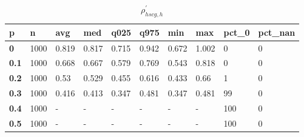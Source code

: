 \begin{table}[h]
 \centering 
\footnotesize
\caption{$\rho_{hscg,h}^\prime $}
\label{tab:alphahscgh}
\begin{tabular}[h]{|l|l|l|l|l|l|l|l|l|l|
    } \hline
\textbf{ p} & \textbf{ n} & \textbf{ avg} & \textbf{ med} & \textbf{ q025} & \textbf{ q975} & \textbf{ min} & \textbf{ max} & \textbf{ pct\_0} & \textbf{ pct\_nan}
    \\ \hline
  \textbf{  0} & 1000 & 0.819 & 0.817 & 0.715 & 0.942 & 0.672 & 1.002 &   0 & 0
    \\ \hline
  \textbf{0.1} & 1000 & 0.668 & 0.667 & 0.579 & 0.769 & 0.543 & 0.818 &   0 & 0
    \\ \hline
  \textbf{0.2} & 1000 &  0.53 & 0.529 & 0.455 & 0.616 & 0.433 &  0.66 &   1 & 0
    \\ \hline
  \textbf{0.3} & 1000 & 0.416 & 0.413 & 0.347 & 0.481 & 0.347 & 0.481 &  99 & 0
    \\ \hline
  \textbf{0.4} & 1000 & - & - & - & - & - & - & 100 & 0
    \\ \hline
  \textbf{0.5} & 1000 & - & - & - & - & - & - & 100 & 0
    \\ \hline
 \end{tabular}
 \end{table}
